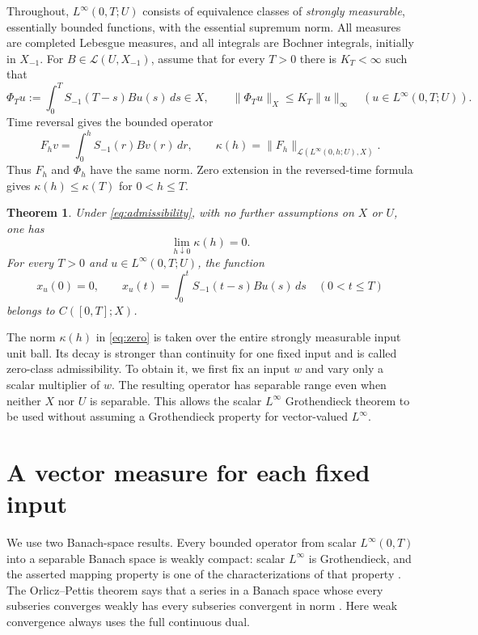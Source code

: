 \documentclass[11pt]{article}
\newtheorem{theorem}{Theorem}
\theoremstyle{remark}
\newcommand{\Lin}{\mathcal L}
\begin{document}
Throughout, \(L^\infty(0,T;U)\) consists of equivalence classes of
\emph{strongly measurable}, essentially bounded functions, with the
essential supremum norm. All measures are completed Lebesgue measures,
and all integrals are Bochner integrals, initially in \(X_{-1}\).
For \(B\in\Lin(U,X_{-1})\), assume that for every \(T>0\) there is
\(K_T<\infty\) such that
\begin{equation}\label{eq:admissibility}
 \Phi_Tu:=\int_0^T S_{-1}(T-s)Bu(s)\,ds\in X,\qquad
 \|\Phi_Tu\|_X\le K_T\|u\|_\infty
 \quad(u\in L^\infty(0,T;U)).
\end{equation}
Time reversal gives the bounded operator
\begin{equation}\label{eq:reversed}
 F_hv=\int_0^h S_{-1}(r)Bv(r)\,dr,\qquad
 \kappa(h)=\|F_h\|_{\Lin(L^\infty(0,h;U),X)} .
\end{equation}
Thus \(F_h\) and \(\Phi_h\) have the same norm. Zero extension in the
reversed-time formula gives \(\kappa(h)\le\kappa(T)\) for \(0<h\le T\).

\begin{theorem}\label{thm:main}
Under \eqref{eq:admissibility}, with no further assumptions on \(X\) or
\(U\), one has
\begin{equation}\label{eq:zero}
 \lim_{h\downarrow0}\kappa(h)=0.
\end{equation}
For every \(T>0\) and \(u\in L^\infty(0,T;U)\), the function
\[
 x_u(0)=0,\qquad
 x_u(t)=\int_0^t S_{-1}(t-s)Bu(s)\,ds\quad(0<t\le T)
\]
belongs to \(C([0,T];X)\).
\end{theorem}

The norm \(\kappa(h)\) in \eqref{eq:zero} is taken over the entire strongly
measurable input unit ball. Its decay is stronger than continuity for one
fixed input and is called zero-class admissibility.
To obtain it, we first fix an input \(w\) and vary only a scalar multiplier
of \(w\). The resulting operator has separable range even when neither
\(X\) nor \(U\) is separable. This allows the scalar \(L^\infty\)
Grothendieck theorem to be used without assuming a Grothendieck property
for vector-valued \(L^\infty\).

\section{A vector measure for each fixed input}

We use two Banach-space results. Every bounded operator from scalar
\(L^\infty(0,T)\) into a separable Banach space is weakly compact:
scalar \(L^\infty\) is Grothendieck, and the asserted mapping property is
one of the characterizations of that property
\cite[Theorem~3.1.1 and Proposition~4.1.5]{GK}.
The Orlicz--Pettis theorem says that a series in a Banach space whose
every subseries converges weakly has every subseries convergent in norm
\cite[Chapter~IV, p.~24]{Diestel}.
Here weak convergence always uses the full continuous dual.
\end{document}
